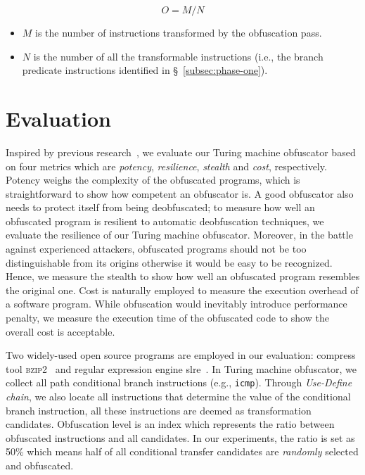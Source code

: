 \documentclass[lnicst]{svmultln}
\begin{document}
\[ O = M / N \]

\begin{itemize}
  \item \(M\) is the number of instructions transformed by the obfuscation pass.
  \item \(N\) is the number of all the transformable instructions (i.e., the
    branch predicate instructions identified in \S~\ref{subsec:phase-one}).
\end{itemize}

\section{Evaluation}
\label{sec:evaluation}
Inspired by previous research~\cite{Collberg, Ma, Maieee}, we evaluate our
Turing machine obfuscator based on four metrics which are \textit{potency},
\textit{resilience}, \textit{stealth} and \textit{cost}, respectively. Potency
weighs the complexity of the obfuscated programs, which is straightforward to
show how competent an obfuscator is. A good obfuscator also needs to protect
itself from being deobfuscated; to measure how well an obfuscated program is
resilient to automatic deobfuscation techniques, we evaluate the resilience of
our Turing machine obfuscator. Moreover, in the battle against experienced
attackers, obfuscated programs should not be too distinguishable from its
origins otherwise it would be easy to be recognized. Hence, we measure the
stealth to show how well an obfuscated program resembles the original one. Cost
is naturally employed to measure the execution overhead of a software program.
While obfuscation would inevitably introduce performance penalty, we measure the
execution time of the obfuscated code to show the overall cost is acceptable.

Two widely-used open source programs are employed in our evaluation: compress
tool \textsc{bzip2}~\cite{bzip2} and regular expression engine slre~\cite{slre}.
In Turing machine obfuscator, we collect all path conditional branch instructions (e.g.,
\texttt{icmp}). Through \textit{Use-Define chain}, we also locate all  instructions that determine the value of the
conditional branch instruction, all these instructions are deemed as
transformation candidates. Obfuscation level is an index which represents the
ratio between obfuscated instructions and all candidates. In our experiments,
the ratio is set as 50\% which means half of all conditional transfer candidates
are \textit{randomly} selected and obfuscated.
\end{document}
